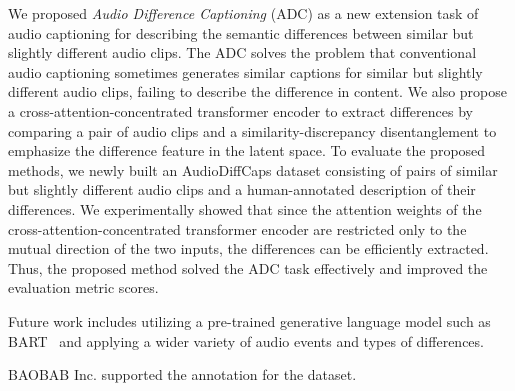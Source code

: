 We proposed \textit{Audio Difference Captioning} (ADC) as a new extension task of audio captioning for describing the semantic differences between similar but slightly different audio clips.
The ADC solves the problem that conventional audio captioning sometimes generates similar captions for similar but slightly different audio clips, failing to describe the difference in content.
We also propose a cross-attention-concentrated transformer encoder to extract differences by comparing a pair of audio clips and a similarity-discrepancy disentanglement to emphasize the difference feature in the latent space.
To evaluate the proposed methods, we newly built an AudioDiffCaps dataset consisting of pairs of similar but slightly different audio clips and a human-annotated description of their differences.
We experimentally showed that since the attention weights of the cross-attention-concentrated transformer encoder are restricted only to the mutual direction of the two inputs, the differences can be efficiently extracted.
Thus, the proposed method solved the ADC task effectively and improved the evaluation metric scores.

Future work includes utilizing a pre-trained generative language model such as BART~\cite{lewis-etal-2020-bart} and applying a wider variety of audio events and types of differences.

\vspace{-3pt}
BAOBAB Inc. supported the annotation for the dataset.

